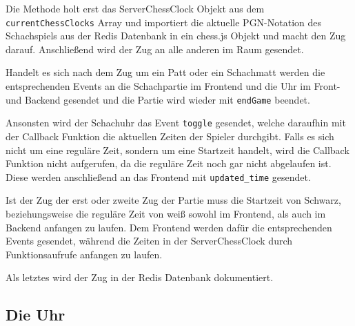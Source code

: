 Die Methode holt erst das ServerChessClock Objekt aus dem \verb|currentChessClocks| Array und importiert die aktuelle PGN-Notation des Schachspiels aus der Redis Datenbank in ein chess.js Objekt und macht den Zug darauf. Anschließend wird der Zug an alle anderen im Raum gesendet.

Handelt es sich nach dem Zug um ein Patt oder ein Schachmatt werden die entsprechenden Events an die Schachpartie im Frontend und die Uhr im Front- und Backend gesendet und die Partie wird wieder mit \verb|endGame| beendet.

Ansonsten wird der Schachuhr das Event \verb|toggle| gesendet, welche daraufhin mit der Callback Funktion die aktuellen Zeiten der Spieler durchgibt. Falls es sich nicht um eine reguläre Zeit, sondern um eine Startzeit handelt, wird die Callback Funktion nicht aufgerufen, da die reguläre Zeit noch gar nicht abgelaufen ist. Diese werden anschließend an das Frontend mit \verb|updated_time| gesendet.

Ist der Zug der erst oder zweite Zug der Partie muss die Startzeit von Schwarz, beziehungsweise die reguläre Zeit von weiß sowohl im Frontend, als auch im Backend anfangen zu laufen. Dem Frontend werden dafür die entsprechenden Events gesendet, während die Zeiten in der ServerChessClock durch Funktionsaufrufe anfangen zu laufen.

Als letztes wird der Zug in der Redis Datenbank dokumentiert.
\subsection{Die Uhr}